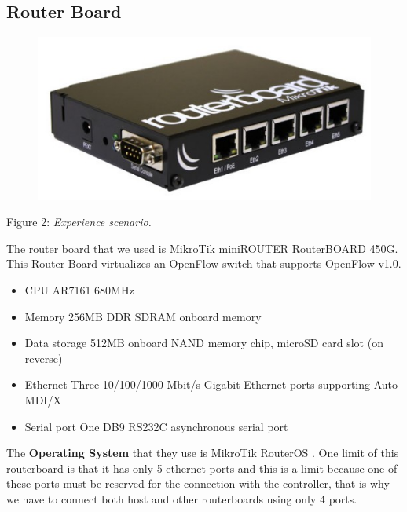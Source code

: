 \documentclass[article,10pt]{IEEEtran}
\begin{document}
\subsection{Router Board}
\begin{figure}[!h]
  \centering
  \includegraphics[scale=0.30]{images/rboard.png}
  
  \label{fig:topo}
\end{figure}
\begin{center}
 {Figure 2: \emph{Experience scenario.}}
\end{center}



The router board that we used is MikroTik miniROUTER RouterBOARD 450G. This Router Board virtualizes an OpenFlow switch that supports
OpenFlow v1.0\cite{routerboard_doc}.
\begin{itemize}
   \item CPU		AR7161 680MHz
   \item Memory		256MB DDR SDRAM onboard memory
   \item Data storage	512MB onboard NAND memory chip, microSD card slot (on reverse)
   \item Ethernet 	Three 10/100/1000 Mbit/s Gigabit Ethernet ports supporting Auto-MDI/X
   \item Serial port 	One DB9 RS232C asynchronous serial port
\end{itemize}

The \textbf{Operating System} that they use is MikroTik RouterOS \cite{routeboard_software}.
\newline
One limit of this routerboard is that it has only 5 ethernet ports and this is a limit because one of these ports must be
reserved for the connection with the controller, that is why we have to connect both host and other routerboards using only 4 ports.
\end{document}
